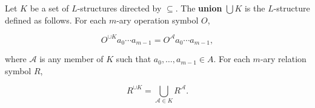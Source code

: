 Let $K$ be a set of $L$-structures directed by $\subseteq$. The \textbf{union} $\bigcup K$ is the $L$-structure defined as follows. For each $m$-ary operation symbol $O$,

$$
O^{\cup K} a_0 \cdots a_{m-1} = O^{\mathcal{A}} a_0 \cdots a_{m-1},
$$

where $\mathcal{A}$ is any member of $K$ such that $a_0, \ldots, a_{m-1} \in A$. For each $m$-ary relation symbol $R$,

$$
R^{\cup K} = \bigcup_{\mathcal{A} \in K} R^{\mathcal{A}}.
$$

